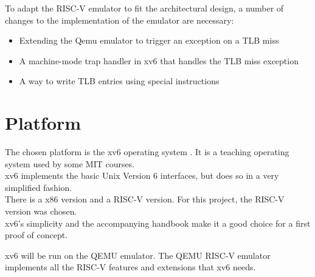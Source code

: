 To adapt the RISC-V emulator to fit the architectural design, a number of changes to the implementation of the emulator are necessary:

\begin{itemize}
    \item Extending the Qemu emulator to trigger an exception on a TLB miss
    \item A machine-mode trap handler in xv6 that handles the TLB miss exception
    \item A way to write TLB entries using special instructions
\end{itemize}


\section{Platform}
The chosen platform is the xv6 operating system \cite{xv6source}. It is a teaching operating system
used by some MIT courses.\\
xv6 implements the basic Unix Version 6 interfaces, but does so in a very simplified fashion.\\
There is a x86 version and a RISC-V version. For this project, the RISC-V version was chosen.\\
xv6's simplicity and the accompanying handbook \cite{cox2011xv6} make it a good choice for a first
proof of concept.

xv6 will be run on the QEMU \cite{QEMUSource2024} emulator. The QEMU RISC-V emulator implements
all the RISC-V features and extensions that xv6 needs.

